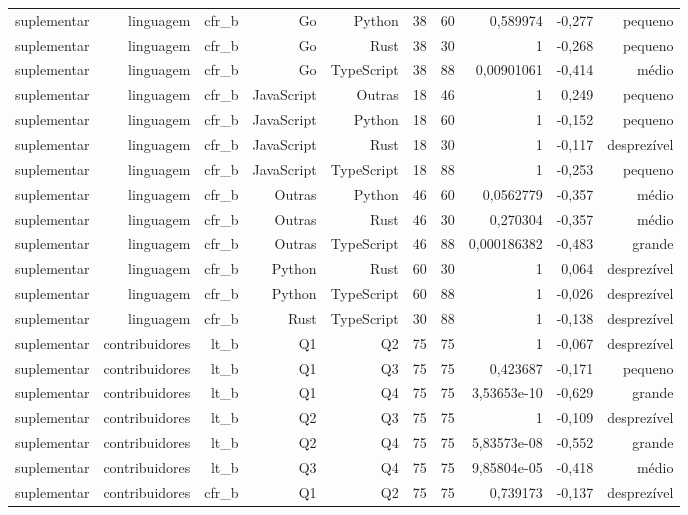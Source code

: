 \begin{tabular}{lrrrrrrrrr}
suplementar & linguagem & cfr\_b & Go & Python & 38 & 60 & 0,589974 & -0,277 & pequeno \\
suplementar & linguagem & cfr\_b & Go & Rust & 38 & 30 & 1 & -0,268 & pequeno \\
suplementar & linguagem & cfr\_b & Go & TypeScript & 38 & 88 & 0,00901061 & -0,414 & médio \\
suplementar & linguagem & cfr\_b & JavaScript & Outras & 18 & 46 & 1 & 0,249 & pequeno \\
suplementar & linguagem & cfr\_b & JavaScript & Python & 18 & 60 & 1 & -0,152 & pequeno \\
suplementar & linguagem & cfr\_b & JavaScript & Rust & 18 & 30 & 1 & -0,117 & desprezível \\
suplementar & linguagem & cfr\_b & JavaScript & TypeScript & 18 & 88 & 1 & -0,253 & pequeno \\
suplementar & linguagem & cfr\_b & Outras & Python & 46 & 60 & 0,0562779 & -0,357 & médio \\
suplementar & linguagem & cfr\_b & Outras & Rust & 46 & 30 & 0,270304 & -0,357 & médio \\
suplementar & linguagem & cfr\_b & Outras & TypeScript & 46 & 88 & 0,000186382 & -0,483 & grande \\
suplementar & linguagem & cfr\_b & Python & Rust & 60 & 30 & 1 & 0,064 & desprezível \\
suplementar & linguagem & cfr\_b & Python & TypeScript & 60 & 88 & 1 & -0,026 & desprezível \\
suplementar & linguagem & cfr\_b & Rust & TypeScript & 30 & 88 & 1 & -0,138 & desprezível \\
suplementar & contribuidores & lt\_b & Q1 & Q2 & 75 & 75 & 1 & -0,067 & desprezível \\
suplementar & contribuidores & lt\_b & Q1 & Q3 & 75 & 75 & 0,423687 & -0,171 & pequeno \\
suplementar & contribuidores & lt\_b & Q1 & Q4 & 75 & 75 & 3,53653e-10 & -0,629 & grande \\
suplementar & contribuidores & lt\_b & Q2 & Q3 & 75 & 75 & 1 & -0,109 & desprezível \\
suplementar & contribuidores & lt\_b & Q2 & Q4 & 75 & 75 & 5,83573e-08 & -0,552 & grande \\
suplementar & contribuidores & lt\_b & Q3 & Q4 & 75 & 75 & 9,85804e-05 & -0,418 & médio \\
suplementar & contribuidores & cfr\_b & Q1 & Q2 & 75 & 75 & 0,739173 & -0,137 & desprezível \\

\end{tabular}
